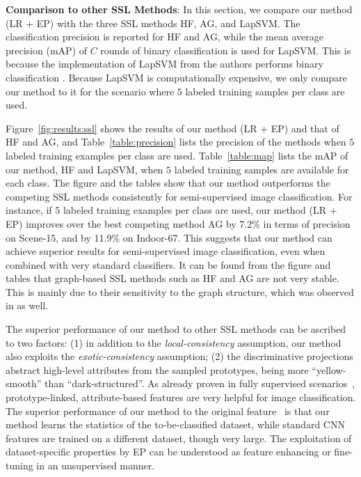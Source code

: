 \documentclass[preprint,12pt,3p]{elsarticle}
\begin{document}
\textbf{Comparison to other SSL Methods}: In this section, we compare
our method (LR + EP) with the three SSL methods HF, AG, and LapSVM.
The classification precision is reported for HF and AG, while the mean average
precision (mAP) of $C$ rounds of binary classification is used for
LapSVM. This is because the implementation of LapSVM from the authors 
performs binary classification \citep{Belkin:semiframe:2006}. Because LapSVM is computationally
expensive, we only compare our method to it for the scenario where $5$
labeled training samples per class are used.

Figure~\ref{fig:results:ssl} shows the results of our method (LR + EP)
and that of HF and AG, and Table~\ref{table:precision} lists the
precision of the methods when $5$ labeled training examples per class
are used. Table~\ref{table:map} lists the mAP of our method, HF and
LapSVM, when $5$ labeled training samples are available for each
class. The figure and the tables show that our method outperforms the
competing SSL methods consistently for semi-supervised image
classification.  For instance, if $5$ labeled training examples per
class are used, our method (LR + EP) improves over the best competing
method AG by 7.2\% in terms of precision on Scene-15, and by 11.9\% on
Indoor-67. This suggests that our method can achieve superior results
for semi-supervised image classification, even when combined with very
standard classifiers. It can be found from the figure and tables that
graph-based SSL methods such as HF and AG are not very stable. This is
mainly due to their sensitivity to the graph structure, which was
observed in \citep{nips14:ssl} as well.


The superior performance of our method to other SSL methods can be ascribed to two factors: (1) in addition to the
\emph{local-consistency} assumption, our method also exploits the
\emph{exotic-consistency} assumption; (2) the discriminative
projections abstract high-level attributes from the sampled
prototypes, \eg being more ``yellow-smooth'' than
``dark-structured''.  As already proven in fully supervised
scenarios~\citep{ObjectAttribute:cvpr09, Transfer:CVPR:08},
prototype-linked, attribute-based features are very helpful for image
classification.  
The superior performance of our method to the original feature~\citep{deep:bmvc14} is that 
our method learns the statistics of the to-be-classified dataset, while standard CNN features are trained
on a different dataset, though very large. The exploitation of
 dataset-specific properties by EP can be understood as 
feature enhancing or fine-tuning in an unsupervised manner.   
\end{document}
